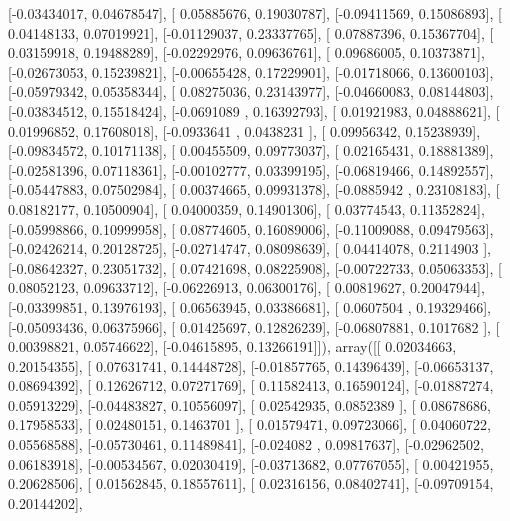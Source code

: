 \documentclass{article}
\begin{document}
       [-0.03434017,  0.04678547],
       [ 0.05885676,  0.19030787],
       [-0.09411569,  0.15086893],
       [ 0.04148133,  0.07019921],
       [-0.01129037,  0.23337765],
       [ 0.07887396,  0.15367704],
       [ 0.03159918,  0.19488289],
       [-0.02292976,  0.09636761],
       [ 0.09686005,  0.10373871],
       [-0.02673053,  0.15239821],
       [-0.00655428,  0.17229901],
       [-0.01718066,  0.13600103],
       [-0.05979342,  0.05358344],
       [ 0.08275036,  0.23143977],
       [-0.04660083,  0.08144803],
       [-0.03834512,  0.15518424],
       [-0.0691089 ,  0.16392793],
       [ 0.01921983,  0.04888621],
       [ 0.01996852,  0.17608018],
       [-0.0933641 ,  0.0438231 ],
       [ 0.09956342,  0.15238939],
       [-0.09834572,  0.10171138],
       [ 0.00455509,  0.09773037],
       [ 0.02165431,  0.18881389],
       [-0.02581396,  0.07118361],
       [-0.00102777,  0.03399195],
       [-0.06819466,  0.14892557],
       [-0.05447883,  0.07502984],
       [ 0.00374665,  0.09931378],
       [-0.0885942 ,  0.23108183],
       [ 0.08182177,  0.10500904],
       [ 0.04000359,  0.14901306],
       [ 0.03774543,  0.11352824],
       [-0.05998866,  0.10999958],
       [ 0.08774605,  0.16089006],
       [-0.11009088,  0.09479563],
       [-0.02426214,  0.20128725],
       [-0.02714747,  0.08098639],
       [ 0.04414078,  0.2114903 ],
       [-0.08642327,  0.23051732],
       [ 0.07421698,  0.08225908],
       [-0.00722733,  0.05063353],
       [ 0.08052123,  0.09633712],
       [-0.06226913,  0.06300176],
       [ 0.00819627,  0.20047944],
       [-0.03399851,  0.13976193],
       [ 0.06563945,  0.03386681],
       [ 0.0607504 ,  0.19329466],
       [-0.05093436,  0.06375966],
       [ 0.01425697,  0.12826239],
       [-0.06807881,  0.1017682 ],
       [ 0.00398821,  0.05746622],
       [-0.04615895,  0.13266191]]), array([[ 0.02034663,  0.20154355],
       [ 0.07631741,  0.14448728],
       [-0.01857765,  0.14396439],
       [-0.06653137,  0.08694392],
       [ 0.12626712,  0.07271769],
       [ 0.11582413,  0.16590124],
       [-0.01887274,  0.05913229],
       [-0.04483827,  0.10556097],
       [ 0.02542935,  0.0852389 ],
       [ 0.08678686,  0.17958533],
       [ 0.02480151,  0.1463701 ],
       [ 0.01579471,  0.09723066],
       [ 0.04060722,  0.05568588],
       [-0.05730461,  0.11489841],
       [-0.024082  ,  0.09817637],
       [-0.02962502,  0.06183918],
       [-0.00534567,  0.02030419],
       [-0.03713682,  0.07767055],
       [ 0.00421955,  0.20628506],
       [ 0.01562845,  0.18557611],
       [ 0.02316156,  0.08402741],
       [-0.09709154,  0.20144202],
\end{document}
